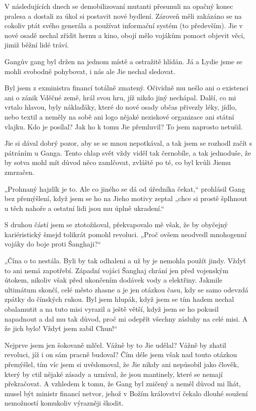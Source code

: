 V následujících dnech se demobilizovaní mutanti přesunuli na opačný konec pralesa a dostali za úkol si postavit nové bydlení. Zároveň měli zakázáno se na cokoliv ptát svého generála a používat informační systém (to především). Jie v nové osadě nechal zřídit hernu a kino, obojí mělo vojákům pomoct objevit věci, jimiž běžní lidé tráví.

Gangův gang byl držen na jednom místě a ostražitě hlídán. Já a Lydie jsme se mohli svobodně pohybovat, i nás ale Jie nechal sledovat.

Byl jsem z exministra financí totálně zmatený. Očividně mu nešlo ani o existenci ani o zánik Vděčné země, hrál svou hru, jíž nikdo jiný nechápal. Další, co mi vrtalo hlavou, byly náklaďáky, které do nové osady občas přivezly léky, jídlo, nebo textil a neměly na sobě ani logo nějaké neziskové organizace ani státní vlajku. Kdo je posílal? Jak ho k tomu Jie přemluvil? To jsem naprosto netušil.

Jie si dával dobrý pozor, aby se se mnou nepotkával, a tak jsem se rozhodl začít s pátráním u Ganga. Tento chlap svět vždy viděl tak černobíle, a tak jednoduše, že by sotva mohl mít důvod něco zamlčovat, zvláště po té, co byl kvůli Jiemu zmrzačen.

„Prohnaný hajzlík je to. Ale co jiného se dá od úředníka čekat,“ prohlásil Gang bez přemýšlení, když jsem se ho na Jieho motivy zeptal „chce si prostě šplhnout u těch nahoře a ostatní lidi jsou mu úplně ukradení.“

S druhou částí jsem se ztotožňoval, překvapovalo mě však, že by obyčejný kariéristický šmejd tolikrát pomohl revoluci. „Proč ovšem neodvedl mnohogenní vojáky do boje proti Šanghaji?“

„Čína o to nestála. Byli by tak odhaleni a už by je nemohla použít jindy. Vždyť to ani nemá zapotřebí. Západní vojáci Šanghaj chrání jen před vojenským útokem, nikoliv však před ukončením dodávek vody a elektřiny. Jakmile ultimátum skončí, celé město zhasne a je jen otázkou času, kdy se samo odevzdá zpátky do čínských rukou. Byl jsem hlupák, když jsem se tím hadem nechal obalamutit a na tuto misi vyrazil a ještě větší, když jsem se ho pokusil napadnout a dal mu tak důvod, proč mi odepřít všechny zásluhy na celé misi. A že jich bylo! Vždyť jsem zabil Chun!“

Nejprve jsem jen šokovaně mlčel. Vážně by to Jie udělal? Vážně by zhatil revoluci, jíž i on sám pracně budoval? Čím déle jsem však nad touto otázkou přemýšlel, tím víc jsem si uvědomoval, že Jie nikdy ani nepůsobil jako člověk, který by ctil nějaké zásady a uznával, že jsou mantinely, které se nemají překračovat. A vzhledem k tomu, že Gang byl zničený a neměl důvod mi lhát, musel být ministr financí netvor, jehož v Božím království čekalo dlouhé soužení nemožností komukoliv výrazněji škodit. 

